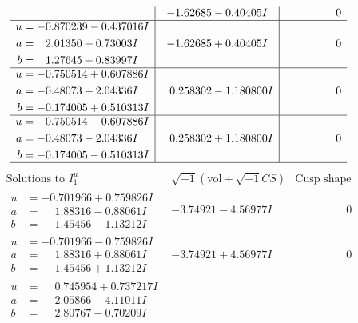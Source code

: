 \documentclass[1p]{elsarticle_modified}
\theoremstyle{definition}
\newcommand{\I}{\sqrt{-1}}
\begin{document}
$$\begin{array}{c|c|c}
 & -1.62685 - 0.40405 I & \phantom{-0.000000 } 0 \\ \hline\begin{aligned}
u &= -0.870239 - 0.437016 I \\
a &= \phantom{-}2.01350 + 0.73003 I \\
b &= \phantom{-}1.27645 + 0.83997 I\end{aligned}
 & -1.62685 + 0.40405 I & \phantom{-0.000000 } 0 \\ \hline\begin{aligned}
u &= -0.750514 + 0.607886 I \\
a &= -0.48073 + 2.04336 I \\
b &= -0.174005 + 0.510313 I\end{aligned}
 & \phantom{-}0.258302 - 1.180800 I & \phantom{-0.000000 } 0 \\ \hline\begin{aligned}
u &= -0.750514 - 0.607886 I \\
a &= -0.48073 - 2.04336 I \\
b &= -0.174005 - 0.510313 I\end{aligned}
 & \phantom{-}0.258302 + 1.180800 I & \phantom{-0.000000 } 0\\
 \hline 
 \end{array}$$\newpage$$\begin{array}{c|c|c}  
\text{Solutions to }I^u_{1}& \I (\text{vol} + \sqrt{-1}CS) & \text{Cusp shape}\\
 \hline 
\begin{aligned}
u &= -0.701966 + 0.759826 I \\
a &= \phantom{-}1.88316 - 0.88061 I \\
b &= \phantom{-}1.45456 - 1.13212 I\end{aligned}
 & -3.74921 - 4.56977 I & \phantom{-0.000000 } 0 \\ \hline\begin{aligned}
u &= -0.701966 - 0.759826 I \\
a &= \phantom{-}1.88316 + 0.88061 I \\
b &= \phantom{-}1.45456 + 1.13212 I\end{aligned}
 & -3.74921 + 4.56977 I & \phantom{-0.000000 } 0 \\ \hline\begin{aligned}
u &= \phantom{-}0.745954 + 0.737217 I \\
a &= \phantom{-}2.05866 - 4.11011 I \\
b &= \phantom{-}2.80767 - 0.70209 I\end{aligned}

\end{array}$$
\end{document}
